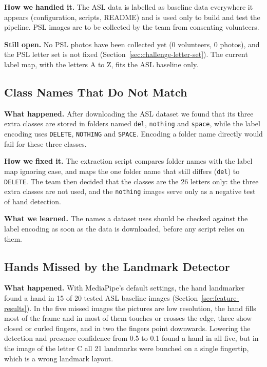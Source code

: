 \textbf{How we handled it.} The ASL data is labelled as baseline data everywhere it appears (configuration, scripts, README) and is used only to build and test the pipeline. PSL images are to be collected by the team from consenting volunteers.

\textbf{Still open.} No PSL photos have been collected yet (0 volunteers, 0 photos), and the PSL letter set is not fixed (Section~\ref{sec:challenge-letter-set}). The current label map, with the letters A to Z, fits the ASL baseline only.

\subsection{Class Names That Do Not Match}

\textbf{What happened.} After downloading the ASL dataset we found that its three extra classes are stored in folders named \texttt{del}, \texttt{nothing} and \texttt{space}, while the label encoding uses \texttt{DELETE}, \texttt{NOTHING} and \texttt{SPACE}. Encoding a folder name directly would fail for these three classes.

\textbf{How we fixed it.} The extraction script compares folder names with the label map ignoring case, and maps the one folder name that still differs (\texttt{del}) to \texttt{DELETE}. The team then decided that the classes are the 26 letters only: the three extra classes are not used, and the \texttt{nothing} images serve only as a negative test of hand detection.

\textbf{What we learned.} The names a dataset uses should be checked against the label encoding as soon as the data is downloaded, before any script relies on them.

\subsection{Hands Missed by the Landmark Detector}
\label{sec:challenge-detection}

\textbf{What happened.} With MediaPipe's default settings, the hand landmarker found a hand in 15 of 20 tested ASL baseline images (Section~\ref{sec:feature-results}). In the five missed images the pictures are low resolution, the hand fills most of the frame and in most of them touches or crosses the edge, three show closed or curled fingers, and in two the fingers point downwards. Lowering the detection and presence confidence from 0.5 to 0.1 found a hand in all five, but in the image of the letter C all 21 landmarks were bunched on a single fingertip, which is a wrong landmark layout.

